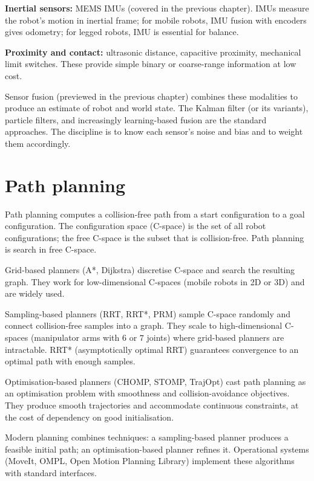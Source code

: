 \textbf{Inertial sensors:} MEMS IMUs (covered in the previous chapter). IMUs measure the robot's motion in inertial frame; for mobile robots, IMU fusion with encoders gives odometry; for legged robots, IMU is essential for balance.

\textbf{Proximity and contact:} ultrasonic distance, capacitive proximity, mechanical limit switches. These provide simple binary or coarse-range information at low cost.

Sensor fusion (previewed in the previous chapter) combines these modalities to produce an estimate of robot and world state. The Kalman filter (or its variants), particle filters, and increasingly learning-based fusion are the standard approaches. The discipline is to know each sensor's noise and bias and to weight them accordingly.

\section{Path planning}

Path planning computes a collision-free path from a start configuration to a goal configuration. The configuration space (C-space) is the set of all robot configurations; the free C-space is the subset that is collision-free. Path planning is search in free C-space.

Grid-based planners (A*, Dijkstra) discretise C-space and search the resulting graph. They work for low-dimensional C-spaces (mobile robots in 2D or 3D) and are widely used.

Sampling-based planners (RRT, RRT*, PRM) sample C-space randomly and connect collision-free samples into a graph. They scale to high-dimensional C-spaces (manipulator arms with $6$ or $7$ joints) where grid-based planners are intractable. RRT* (asymptotically optimal RRT) guarantees convergence to an optimal path with enough samples.

Optimisation-based planners (CHOMP, STOMP, TrajOpt) cast path planning as an optimisation problem with smoothness and collision-avoidance objectives. They produce smooth trajectories and accommodate continuous constraints, at the cost of dependency on good initialisation.

Modern planning combines techniques: a sampling-based planner produces a feasible initial path; an optimisation-based planner refines it. Operational systems (MoveIt, OMPL, Open Motion Planning Library) implement these algorithms with standard interfaces.

